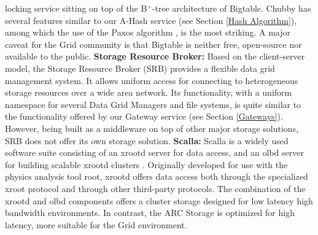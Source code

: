 \documentclass[final]{ieee}
\begin{document}
locking service sitting on top of the B$^+$-tree architecture of
Bigtable. Chubby has several features similar to our A-Hash service (see Section \ref{Hash Algorithm}),
among which the use of the Paxos algorithm \cite{Paxos,PaxosLive}, is
the most striking. A major caveat for the Grid community is that
Bigtable is neither free, open-source nor available to the public.
\newline
\textbf{Storage Resource Broker:}  Based on the client-server model,
the Storage Resource Broker (SRB) \cite{earlySRB,SRB} provides a flexible data grid management
system. It allows  uniform access for connecting to heterogeneous
storage resources over a wide area network. %
Its functionality, with a uniform namespace for several Data Grid
Managers and file systems, is quite similar to the functionality
offered by our Gateway service (see Section \ref{Gateways}). However, being built as a middleware on top of
other major storage solutions, SRB does not offer its own storage solution.
\newline
\textbf{Scalla:} Scalla is a widely used software suite consisting of an
xrootd server for data access, and an olbd
server for building scalable xrootd clusters \cite{Scalla}. %
Originally developed for use with the physics analysis tool root,
xrootd offers data access both through the specialized xroot protocol
and through other third-party protocols. The combination of the xrootd
and olbd components offers a cluster storage designed for low latency
high bandwidth environments. In contrast, the ARC Storage is optimized
for high latency, more suitable for the Grid environment.
\end{document}
